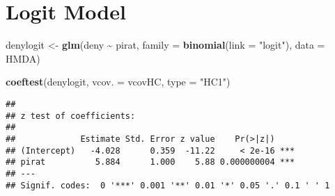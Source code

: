 \documentclass[
]{article}
\newenvironment{Shaded}{\begin{snugshade}}{\end{snugshade}}
\newcommand{\DataTypeTok}[1]{\textcolor[rgb]{0.13,0.29,0.53}{#1}}
\newcommand{\KeywordTok}[1]{\textcolor[rgb]{0.13,0.29,0.53}{\textbf{#1}}}
\newcommand{\NormalTok}[1]{#1}
\newcommand{\OperatorTok}[1]{\textcolor[rgb]{0.81,0.36,0.00}{\textbf{#1}}}
\newcommand{\StringTok}[1]{\textcolor[rgb]{0.31,0.60,0.02}{#1}}
\begin{document}
\hypertarget{logit-model}{%
\section{Logit Model}\label{logit-model}}

\begin{Shaded}
\begin{Highlighting}[]
\NormalTok{denylogit \textless{}{-}}\StringTok{ }\KeywordTok{glm}\NormalTok{(deny }\OperatorTok{\textasciitilde{}}\StringTok{ }\NormalTok{pirat, }
                 \DataTypeTok{family =} \KeywordTok{binomial}\NormalTok{(}\DataTypeTok{link =} \StringTok{"logit"}\NormalTok{), }
                 \DataTypeTok{data =}\NormalTok{ HMDA)}

\KeywordTok{coeftest}\NormalTok{(denylogit, }\DataTypeTok{vcov. =}\NormalTok{ vcovHC, }\DataTypeTok{type =} \StringTok{"HC1"}\NormalTok{)}
\end{Highlighting}
\end{Shaded}

\begin{verbatim}
## 
## z test of coefficients:
## 
##             Estimate Std. Error z value    Pr(>|z|)    
## (Intercept)   -4.028      0.359  -11.22     < 2e-16 ***
## pirat          5.884      1.000    5.88 0.000000004 ***
## ---
## Signif. codes:  0 '***' 0.001 '**' 0.01 '*' 0.05 '.' 0.1 ' ' 1
\end{verbatim}
\end{document}
